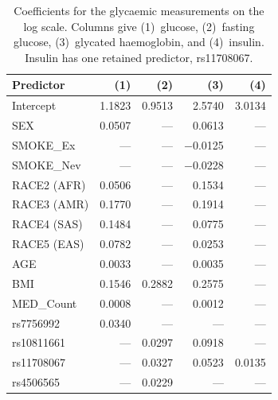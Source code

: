 \begin{table}[ht]
\centering
\caption{Coefficients for the glycaemic measurements on the log scale. Columns give (1)~glucose, (2)~fasting glucose, (3)~glycated haemoglobin, and (4)~insulin. Insulin has one retained predictor, rs11708067.}
\label{tab:app_coef_diabete}
\small
\begin{tabular}{lrrrr}
\hline
\textbf{Predictor} & \textbf{(1)} & \textbf{(2)} & \textbf{(3)} & \textbf{(4)} \\
\hline
Intercept    &  1.1823 &  0.9513 &  2.5740 &  3.0134 \\
SEX          &  0.0507 &     --- &  0.0613 &     --- \\
SMOKE\_Ex    &     --- &     --- & $-$0.0125 &     --- \\
SMOKE\_Nev   &     --- &     --- & $-$0.0228 &     --- \\
RACE2 (AFR)  &  0.0506 &     --- &  0.1534 &     --- \\
RACE3 (AMR)  &  0.1770 &     --- &  0.1914 &     --- \\
RACE4 (SAS)  &  0.1484 &     --- &  0.0775 &     --- \\
RACE5 (EAS)  &  0.0782 &     --- &  0.0253 &     --- \\
AGE          &  0.0033 &     --- &  0.0035 &     --- \\
BMI          &  0.1546 &  0.2882 &  0.2575 &     --- \\
MED\_Count   &  0.0008 &     --- &  0.0012 &     --- \\
rs7756992    &  0.0340 &     --- &     --- &     --- \\
rs10811661   &     --- &  0.0297 &  0.0918 &     --- \\
rs11708067   &     --- &  0.0327 &  0.0523 &  0.0135 \\
rs4506565    &     --- &  0.0229 &     --- &     --- \\
\hline
\end{tabular}
\end{table}

